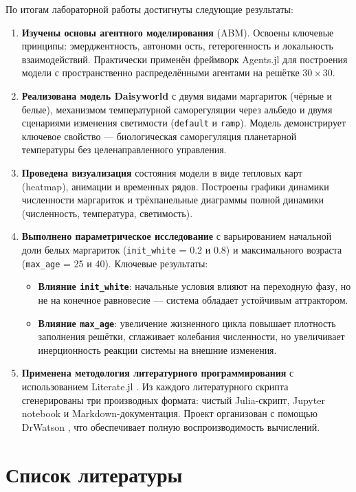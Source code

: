 \documentclass[
  12pt,
  a4paper,
  DIV=11,
  numbers=noendperiod]{scrreprt}
\providecommand{\tightlist}{%
  \setlength{\itemsep}{0pt}\setlength{\parskip}{0pt}}\usepackage{longtable,booktabs,array}
\begin{document}
По итогам лабораторной работы достигнуты следующие результаты:

\begin{enumerate}
\def\labelenumi{\arabic{enumi}.}
\item
  \textbf{Изучены основы агентного моделирования} (ABM). Освоены
  ключевые принципы: эмерджентность, автономн ость, гетерогенность и
  локальность взаимодействий. Практически применён фреймворк Agents.jl
  для построения модели с пространственно распределёнными агентами на
  решётке \(30 \times 30\).
\item
  \textbf{Реализована модель Daisyworld}
  \autocite{lovelock_1983,watson_1983} с двумя видами маргариток (чёрные
  и белые), механизмом температурной саморегуляции через альбедо и двумя
  сценариями изменения светимости (\texttt{default} и \texttt{ramp}).
  Модель демонстрирует ключевое свойство --- биологическая саморегуляция
  планетарной температуры без целенаправленного управления.
\item
  \textbf{Проведена визуализация} состояния модели в виде тепловых карт
  (heatmap), анимации и временных рядов. Построены графики динамики
  численности маргариток и трёхпанельные диаграммы полной динамики
  (численность, температура, светимость).
\item
  \textbf{Выполнено параметрическое исследование} с варьированием
  начальной доли белых маргариток (\texttt{init\_white} = 0.2 и 0.8) и
  максимального возраста (\texttt{max\_age} = 25 и 40). Ключевые
  результаты:

  \begin{itemize}
  \tightlist
  \item
    \textbf{Влияние \texttt{init\_white}}: начальные условия влияют на
    переходную фазу, но не на конечное равновесие --- система обладает
    устойчивым аттрактором.
  \item
    \textbf{Влияние \texttt{max\_age}}: увеличение жизненного цикла
    повышает плотность заполнения решётки, сглаживает колебания
    численности, но увеличивает инерционность реакции системы на внешние
    изменения.
  \end{itemize}
\item
  \textbf{Применена методология литературного программирования}
  \autocite{knuth_1984} с использованием Literate.jl
  \autocite{literate_jl}. Из каждого литературного скрипта сгенерированы
  три производных формата: чистый Julia-скрипт, Jupyter notebook и
  Markdown-документация. Проект организован с помощью DrWatson
  \autocite{drwatson_jl}, что обеспечивает полную воспроизводимость
  вычислений.
\end{enumerate}

\chapter*{Список
литературы}\label{ux441ux43fux438ux441ux43eux43a-ux43bux438ux442ux435ux440ux430ux442ux443ux440ux44b}

\printbibliography[heading=none]
\end{document}
